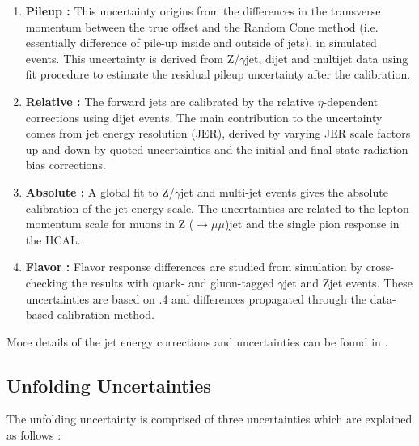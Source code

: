 \begin{enumerate}
\item {\bf Pileup :} This uncertainty origins from the differences in the transverse momentum between the true offset and the Random Cone method (i.e. essentially difference of pile-up inside and outside of jets), in simulated events. This uncertainty is derived from Z/$\gamma$\plusn jet, dijet and multijet data using fit procedure to estimate the residual pileup uncertainty after the calibration. 

\item {\bf Relative :} The forward jets are calibrated by the relative $\eta$-dependent corrections using dijet events. The main contribution to the uncertainty comes from jet energy resolution (JER), derived by varying JER scale factors up and down by quoted uncertainties and the initial and final state radiation bias corrections.

\item {\bf Absolute :} A global fit to Z/$\gamma$\plusn jet and multi-jet events gives the absolute calibration of the jet energy scale. The uncertainties are related to the lepton momentum scale for muons in Z ($\rightarrow\mu\mu$)\plusn jet and the single pion response in the HCAL. 

\item {\bf Flavor :} Flavor response differences are studied from simulation by cross-checking the results with quark- and gluon-tagged $\gamma$\plusn jet and Z\plusn jet events. These uncertainties are based on \PYTHIASn.4 and  differences propagated through the data-based calibration method.   
\end{enumerate}

More details of the jet energy corrections and uncertainties can be found in \cite{JEC}. 

\subsection{Unfolding Uncertainties}
\label{sec:unfolding_unc}

The unfolding uncertainty is comprised of three uncertainties which are explained as follows :

